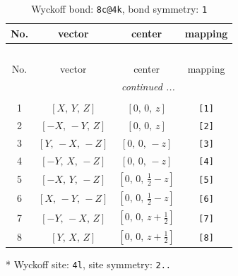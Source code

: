 \documentclass[fleqn,8pt]{jsarticle}
\begin{document}
\renewcommand{\arraystretch}{1.2}
\begin{longtable}{cccc}
\caption{Wyckoff bond: {\tt 8c@4k}, bond symmetry: {\tt 1}}
 \\
 \hline \hline
No. & vector & center & mapping \\ \hline \endfirsthead

\multicolumn{3}{l}{\tablename\ \thetable{}} \\
 \hline \hline
No. & vector & center & mapping \\ \hline \endhead

 \hline \hline
\multicolumn{3}{r}{\footnotesize\it continued ...} \\ \endfoot

 \hline \hline
\multicolumn{3}{r}{} \\ \endlastfoot

1 & $\left[ X,\, Y,\, Z \right]$ & $\left[ 0,\, 0,\, z \right]$ & {\tt [1]} \\ \hline
2 & $\left[ - X,\, - Y,\, Z \right]$ & $\left[ 0,\, 0,\, z \right]$ & {\tt [2]} \\ \hline
3 & $\left[ Y,\, - X,\, - Z \right]$ & $\left[ 0,\, 0,\, - z \right]$ & {\tt [3]} \\ \hline
4 & $\left[ - Y,\, X,\, - Z \right]$ & $\left[ 0,\, 0,\, - z \right]$ & {\tt [4]} \\ \hline
5 & $\left[ - X,\, Y,\, - Z \right]$ & $\left[ 0,\, 0,\, \frac{1}{2} - z \right]$ & {\tt [5]} \\ \hline
6 & $\left[ X,\, - Y,\, - Z \right]$ & $\left[ 0,\, 0,\, \frac{1}{2} - z \right]$ & {\tt [6]} \\ \hline
7 & $\left[ - Y,\, - X,\, Z \right]$ & $\left[ 0,\, 0,\, z + \frac{1}{2} \right]$ & {\tt [7]} \\ \hline
8 & $\left[ Y,\, X,\, Z \right]$ & $\left[ 0,\, 0,\, z + \frac{1}{2} \right]$ & {\tt [8]} \\
\end{longtable}
* Wyckoff site: {\tt 4l}, site symmetry: {\tt 2..}
\renewcommand{\arraystretch}{1.2}
\end{document}
